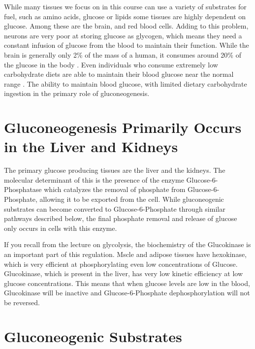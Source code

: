 \documentclass{tufte-handout}
\begin{document}
While many tissues we focus on in this course can use a variety of substrates for fuel, such as amino acids, glucose or lipids some tissues are highly dependent on glucose.  Among these are the brain, and red blood cells.  Adding to this problem, neurons are very poor at storing glucose as glycogen, which means they need a constant infusion of glucose from the blood to maintain their function.  While the brain is generally only 2\% of the mass of a human, it consumes around 20\% of the glucose in the body \citep{Erbsloh1958}.  Even individuals who consume extremely low carbohydrate diets are able to maintain their blood glucose near the normal range \citep{Bueno2013}.  The ability to maintain blood glucose, with limited dietary carbohydrate ingestion in the primary role of gluconeogenesis.

\section{Gluconeogenesis Primarily Occurs in the Liver and Kidneys}

The primary glucose producing tissues are the liver and the kidneys.  The molecular determinant of this is the presence of the enzyme Glucose-6-Phosphatase which catalyzes the removal of phosphate from Glucose-6-Phosphate, allowing it to be exported from the cell.  While gluconeogenic substrates can become converted to Glucose-6-Phosphate through similar pathways described below, the final phosphate removal and release of glucose only occurs in cells with this enzyme.

  If you recall from the lecture on glycolysis, the biochemistry of the Glucokinase is an important part of this regulation.  Mscle and adipose tissues have hexokinase, which is very efficient at phosphorylating even low concentrations of Glucose. Glucokinase, which is present in the liver, has very low kinetic efficiency at low glucose concentrations.  This means that when glucose levels are low in the blood, Glucokinase will be inactive and Glucose-6-Phosphate dephosphorylation will not be reversed.

\section{Gluconeogenic Substrates}
\end{document}
